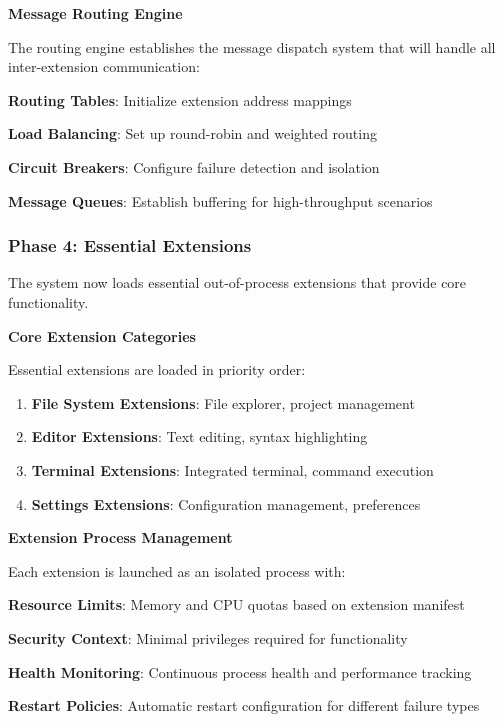 \textbf{Message Routing Engine}

The routing engine establishes the message dispatch system that will handle all inter-extension communication:

\begin{compactlist}
    \item \textbf{Routing Tables}: Initialize extension address mappings
    \item \textbf{Load Balancing}: Set up round-robin and weighted routing
    \item \textbf{Circuit Breakers}: Configure failure detection and isolation
    \item \textbf{Message Queues}: Establish buffering for high-throughput scenarios
\end{compactlist}

\subsubsection{Phase 4: Essential Extensions}

The system now loads essential out-of-process extensions that provide core functionality.

\textbf{Core Extension Categories}

Essential extensions are loaded in priority order:

\begin{enumerate}
    \item \textbf{File System Extensions}: File explorer, project management
    \item \textbf{Editor Extensions}: Text editing, syntax highlighting
    \item \textbf{Terminal Extensions}: Integrated terminal, command execution
    \item \textbf{Settings Extensions}: Configuration management, preferences
\end{enumerate}

\textbf{Extension Process Management}

Each extension is launched as an isolated process with:

\begin{compactlist}
    \item \textbf{Resource Limits}: Memory and CPU quotas based on extension manifest
    \item \textbf{Security Context}: Minimal privileges required for functionality
    \item \textbf{Health Monitoring}: Continuous process health and performance tracking
    \item \textbf{Restart Policies}: Automatic restart configuration for different failure types
\end{compactlist}

